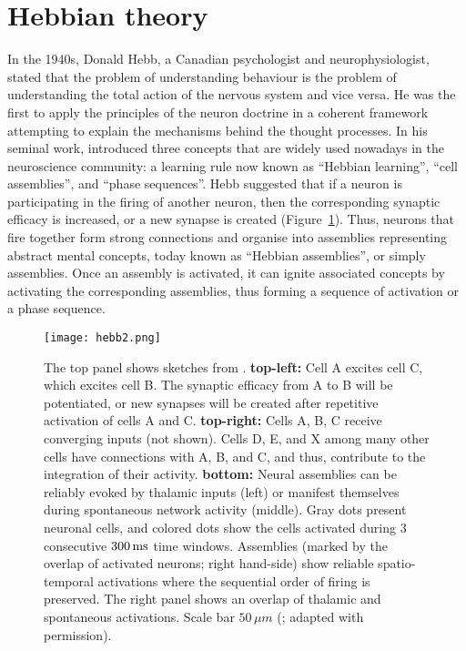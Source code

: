 \section{Hebbian theory}
\label{sec:hebb}
  In the 1940s, Donald Hebb, a Canadian psychologist and neurophysiologist,
  stated that the problem of understanding behaviour is the problem of
  understanding the total action of the nervous system and vice versa. He was
  the first to apply the principles of the neuron doctrine \citep{Cajal1894} in
  a coherent framework attempting to explain the mechanisms behind the thought
  processes. In his seminal work, \cite{Hebb49} introduced three concepts that
  are widely used nowadays in the neuroscience community: a learning rule now
  known as ``Hebbian learning'', ``cell assemblies'', and ``phase sequences''. Hebb
  suggested that if a neuron is participating in the firing of another neuron,
  then the corresponding synaptic efficacy is increased, or a new synapse is
  created (Figure~\ref{fig:hebb}). Thus, neurons that fire together form strong
  connections and organise into assemblies representing abstract mental
  concepts, today known as ``Hebbian assemblies'', or simply assemblies. Once an
  assembly is activated, it can ignite associated concepts by activating the
  corresponding assemblies, thus forming a sequence of activation or a phase
  sequence.
   
    \begin{figure}
      \center
      \texttt{[image: hebb2.png]}
      \caption{
        The top panel shows sketches from \citep{Hebb49}. {\bf top-left:} Cell
        A excites cell C, which excites cell B. The synaptic efficacy from A to
        B will be potentiated, or new synapses will be created after repetitive
        activation of cells A and C. {\bf top-right:} Cells A, B, C receive
        converging inputs (not shown). Cells D, E, and X among many other cells
        have connections with A, B, and C, and thus, contribute to the
        integration of their activity. {\bf bottom:} Neural assemblies can be
        reliably evoked by thalamic inputs (left) or manifest themselves during
        spontaneous network activity (middle). Gray dots present neuronal
        cells, and colored dots show the cells activated during 3 consecutive
        $300\,\rm ms$ time windows. Assemblies (marked by the overlap of
        activated neurons; right hand-side) show reliable spatio-temporal activations
        where the sequential order of firing is preserved. The right panel
        shows an overlap of thalamic and spontaneous activations.  Scale bar
        $50\, \mu m$ (\citealp{Luczak2012}; adapted with permission).
             }
    \label{fig:hebb}
    \end{figure}

